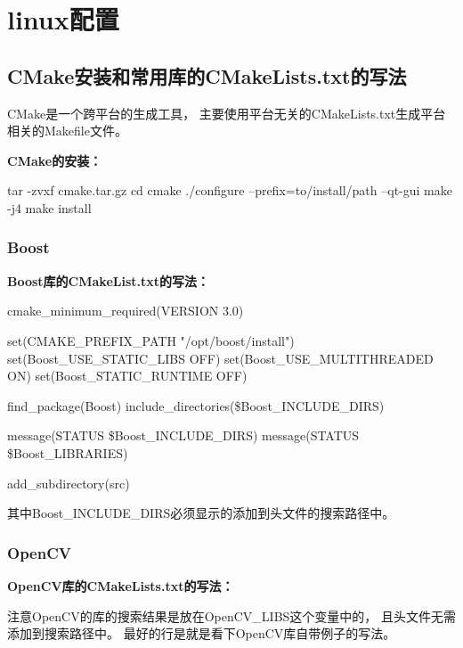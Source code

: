 \chapter{linux配置}

\section{CMake安装和常用库的CMakeLists.txt的写法}
CMake是一个跨平台的生成工具，%
主要使用平台无关的CMakeLists.txt生成平台相关的Makefile文件。%

\noindent\textbf{\color{magenta}CMake的安装：}
\begin{bashcode}
tar -zvxf cmake.tar.gz
cd cmake
./configure --prefix=to/install/path --qt-gui
make -j4
make install
\end{bashcode}


\subsection{Boost}
\noindent\textbf{\color{magenta}Boost库的CMakeList.txt的写法：}
\begin{cmakecode}
  cmake_minimum_required(VERSION 3.0)

  set(CMAKE_PREFIX_PATH "/opt/boost/install")
  set(Boost_USE_STATIC_LIBS OFF)
  set(Boost_USE_MULTITHREADED ON)
  set(Boost_STATIC_RUNTIME OFF)

  find_package(Boost)
  include_directories(\${Boost_INCLUDE_DIRS})

  message(STATUS \${Boost_INCLUDE_DIRS})
  message(STATUS \${Boost_LIBRARIES})

  add_subdirectory(src)
\end{cmakecode}
其中Boost\_INCLUDE\_DIRS必须显示的添加到头文件的搜索路径中。

\subsection{OpenCV}
\noindent\textbf{\color{magenta}OpenCV库的CMakeLists.txt的写法：}
注意OpenCV的库的搜索结果是放在OpenCV\_LIBS这个变量中的，%
且头文件无需添加到搜索路径中。%
最好的行是就是看下OpenCV库自带例子的写法。

